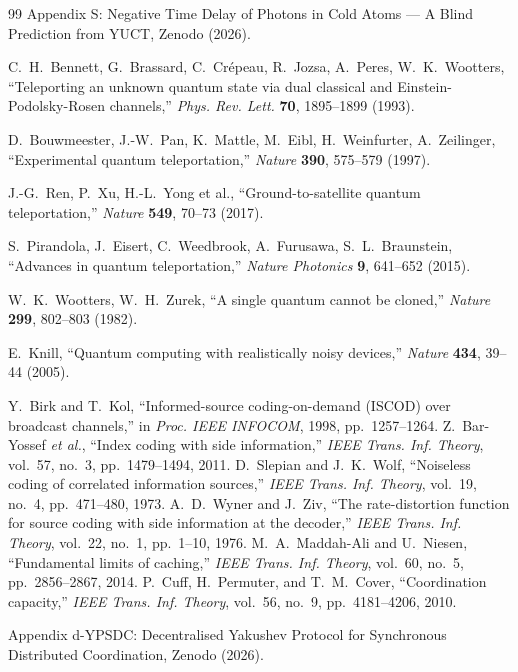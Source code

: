 \documentclass[12pt,a4paper]{article}
\theoremstyle{remark}
\begin{document}
\begin{thebibliography}{99}
		Appendix S: Negative Time Delay of Photons in Cold Atoms --- A Blind Prediction from YUCT, Zenodo (2026).
		
		 C.~H.~Bennett, G.~Brassard, C.~Crépeau, R.~Jozsa, A.~Peres, W.~K.~Wootters,
		``Teleporting an unknown quantum state via dual classical and Einstein-Podolsky-Rosen channels,''
		\emph{Phys. Rev. Lett.} \textbf{70}, 1895--1899 (1993).
		
		 D.~Bouwmeester, J.-W.~Pan, K.~Mattle, M.~Eibl, H.~Weinfurter, A.~Zeilinger,
		``Experimental quantum teleportation,''
		\emph{Nature} \textbf{390}, 575--579 (1997).
		
		 J.-G.~Ren, P.~Xu, H.-L.~Yong et al.,
		``Ground-to-satellite quantum teleportation,''
		\emph{Nature} \textbf{549}, 70--73 (2017).
		
		 S.~Pirandola, J.~Eisert, C.~Weedbrook, A.~Furusawa, S.~L.~Braunstein,
		``Advances in quantum teleportation,''
		\emph{Nature Photonics} \textbf{9}, 641--652 (2015).
		
		 W.~K.~Wootters, W.~H.~Zurek,
		``A single quantum cannot be cloned,''
		\emph{Nature} \textbf{299}, 802--803 (1982).
		
		 E.~Knill,
		``Quantum computing with realistically noisy devices,''
		\emph{Nature} \textbf{434}, 39--44 (2005).
		
		 Y.~Birk and T.~Kol, ``Informed-source coding-on-demand (ISCOD) over broadcast channels,'' in \emph{Proc. IEEE INFOCOM}, 1998, pp.~1257--1264.
		 Z.~Bar-Yossef \emph{et al.}, ``Index coding with side information,'' \emph{IEEE Trans. Inf. Theory}, vol.~57, no.~3, pp.~1479--1494, 2011.
		 D.~Slepian and J.~K.~Wolf, ``Noiseless coding of correlated information sources,'' \emph{IEEE Trans. Inf. Theory}, vol.~19, no.~4, pp.~471--480, 1973.
		 A.~D.~Wyner and J.~Ziv, ``The rate-distortion function for source coding with side information at the decoder,'' \emph{IEEE Trans. Inf. Theory}, vol.~22, no.~1, pp.~1--10, 1976.
		 M.~A.~Maddah-Ali and U.~Niesen, ``Fundamental limits of caching,'' \emph{IEEE Trans. Inf. Theory}, vol.~60, no.~5, pp.~2856--2867, 2014.
		 P.~Cuff, H.~Permuter, and T.~M.~Cover, ``Coordination capacity,'' \emph{IEEE Trans. Inf. Theory}, vol.~56, no.~9, pp.~4181--4206, 2010.
		
		Appendix d-YPSDC: Decentralised Yakushev Protocol for Synchronous Distributed Coordination, Zenodo (2026).
		
	\end{thebibliography}
	
\end{document}
